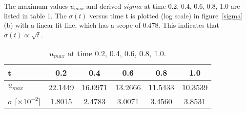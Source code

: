 \documentclass{article}
\begin{document}
The maximum values $u_{max}$ and derived $sigma$ at time 0.2, 0.4, 0.6, 0.8, 1.0 are listed in table 1. The $\sigma (t)$ versus time t is plotted (log scale) in figure~\ref{sigma} (b) with a linear fit line, which has a scope of 0.478. This indicates that $\sigma(t) \propto \sqrt{t}$.\\

\begin{table}[!ht]
\begin{center}
\caption{$u_{max}$ at time 0.2, 0.4, 0.6, 0.8, 1.0.}
\begin{tabular}{ l | c | c | c | c | c }
\hline
t & 0.2 & 0.4 & 0.6 & 0.8 & 1.0 \\ \hline
$u_{max}$ & 22.1449 & 16.0971 & 13.2666 & 11.5433 & 10.3539 \\ \hline
$\sigma$ [$\times 10^{-2}$] & 1.8015 & 2.4783 & 3.0071 & 3.4560 & 3.8531 \\ \hline
\end{tabular}
\end{center}
\label{umax}
\end{table}
\end{document}
